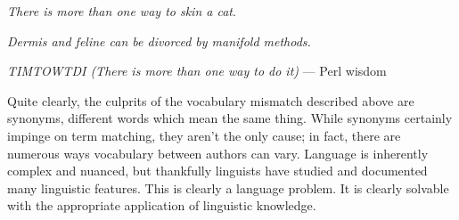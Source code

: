\begin{center}
\textit{There is more than one way to skin a cat}.

\textit{Dermis and feline can be divorced by manifold methods.}

\textit{TIMTOWTDI (There is more than one way to do it)} --- Perl wisdom 
\end{center}

Quite clearly, the culprits of the vocabulary mismatch described above are synonyms, different words which mean the same thing. While synonyms certainly impinge on term matching, they aren't the only cause; in fact, there are numerous ways vocabulary between authors can vary. Language is inherently complex and nuanced, but thankfully linguists have studied and documented many linguistic features. This is clearly a language problem. It is clearly solvable with the appropriate application of linguistic knowledge.










